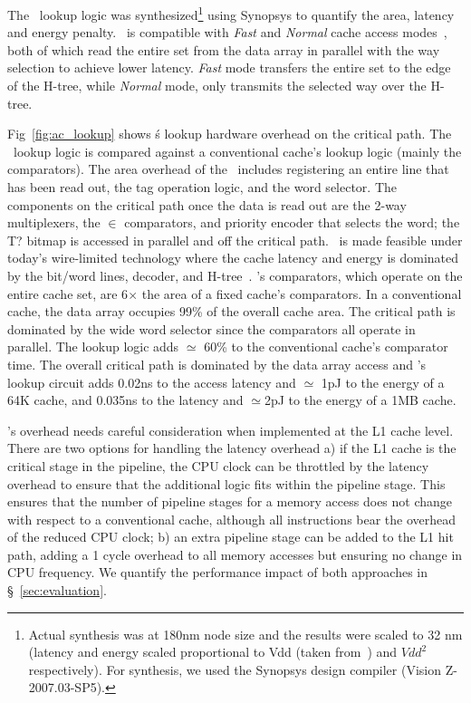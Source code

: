 

The \AC\ lookup logic was synthesized\footnote{Actual synthesis was at 180nm node size and the results were scaled to 32 nm (latency and energy scaled proportional to Vdd (taken from~\cite{Danowitz:2012:CDR:2133806.2133822}) and $Vdd^2$ respectively). For synthesis, we used the Synopsys design compiler (Vision Z-2007.03-SP5).} using Synopsys to quantify the area, latency and energy penalty. \AC\ is compatible with  \textit{Fast} and \textit{Normal} cache access modes~\cite{Muralimanohar:2007:ONO:1331699.1331704}, both of which read the entire set from the data array in parallel with the way selection to  achieve lower latency. \textit{Fast} mode transfers the entire set to the edge of the H-tree, while \textit{Normal} mode, only transmits the selected way over the H-tree. 

Fig~\ref{fig:ac_lookup} shows \AC\'s lookup hardware overhead on the critical path. The \AC\ lookup logic is compared against a conventional cache's lookup logic (mainly the comparators). The area overhead of the \AC\ includes registering an entire line that has been read out, the tag operation logic, and the word selector. The components on the critical path once the data is read out are the 2-way multiplexers, the $\in$ comparators, and priority encoder that selects the word; the T?  bitmap is accessed in parallel and off the critical path. \AC\ is made feasible under today's wire-limited technology where the cache latency and energy is dominated by the bit/word lines, decoder, and H-tree~\cite{Muralimanohar:2007:ONO:1331699.1331704}. \AC{}'s comparators, which operate on the entire cache set, are 6$\times$ the area of a fixed cache's comparators. In a conventional cache, the data array occupies 99\% of the overall cache area. The critical path is dominated by the wide word selector since the comparators all operate in parallel. The lookup logic adds $\simeq$ 60\% to the conventional cache's comparator time. The overall critical path is dominated by the data array access and \AC{}'s lookup circuit adds 0.02ns to the access latency and $\simeq$ 1pJ to the energy of a 64K cache, and 0.035ns to the latency and $\simeq$2pJ to the energy of a 1MB cache. 

\AC{}'s overhead needs careful consideration when implemented at the L1 cache level. There are two options for handling the latency overhead a) if the L1 cache is the critical stage in the pipeline, the CPU clock can be throttled by the latency overhead to ensure that the additional logic fits within the pipeline stage. This ensures that the number of pipeline stages for a memory access does not change with respect to a conventional cache, although all instructions bear the overhead of the reduced CPU clock; b) an extra pipeline stage can be added to the L1 hit path, adding a 1 cycle overhead to all memory accesses but ensuring no change in CPU frequency. We quantify the performance impact of both approaches in \S~\ref{sec:evaluation}.


